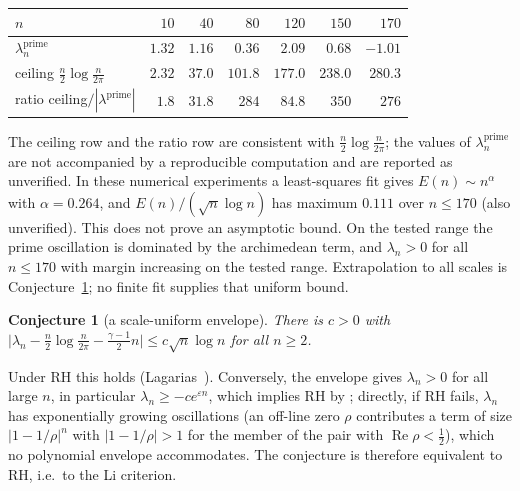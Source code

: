 \documentclass[11pt]{amsart}
\newtheorem{conjecture}[theorem]{Conjecture}
\theoremstyle{definition}
\theoremstyle{remark}
\theoremstyle{definition}
\renewcommand{\Re}{\operatorname{Re}}
\begin{document}
\begin{center}\small
\begin{tabular}{lrrrrrr}
\toprule
$n$ & $10$ & $40$ & $80$ & $120$ & $150$ & $170$\\
\midrule
$\lambda_n^{\mathrm{prime}}$ & $1.32$ & $1.16$ & $0.36$ & $2.09$ & $0.68$ & $-1.01$\\
ceiling $\tfrac{n}{2}\log\tfrac{n}{2\pi}$ & $2.32$ & $37.0$ & $101.8$ & $177.0$ & $238.0$ & $280.3$\\
ratio ceiling$/|\lambda^{\mathrm{prime}}|$ & $1.8$ & $31.8$ & $284$ & $84.8$ & $350$ & $276$\\
\bottomrule
\end{tabular}
\end{center}
\noindent The ceiling row and the ratio row are consistent with $\tfrac n2\log\tfrac n{2\pi}$; the values
of $\lambda_n^{\mathrm{prime}}$ are not accompanied by a reproducible computation and are
reported as unverified.  In these numerical experiments a least-squares fit gives $E(n)\sim n^{\alpha}$
with $\alpha=0.264$, and $E(n)/(\sqrt n\log n)$ has maximum $0.111$ over $n\le170$ (also unverified).
This does not prove an asymptotic bound.  On the tested range the prime oscillation is dominated by the
archimedean term, and $\lambda_n>0$ for all $n\le170$ with margin increasing on the tested range.
Extrapolation to all scales is Conjecture~\ref{conj:envelope}; no finite fit supplies that uniform
bound.

\begin{conjecture}[a scale-uniform envelope]\label{conj:envelope}
There is $c>0$ with
$\bigl|\lambda_n-\tfrac n2\log\tfrac n{2\pi}-\tfrac{\gamma-1}2n\bigr|\le c\sqrt n\log n$ for all $n\ge2$.
\end{conjecture}

\noindent Under RH this holds (Lagarias~\cite[Thm.~6.1]{Lagarias2007}).  Conversely, the envelope gives
$\lambda_n>0$ for all large $n$, in particular $\lambda_n\ge-ce^{\varepsilon n}$, which implies RH by
\cite[Thm.~1]{BombieriLagarias1999}; directly, if RH fails,
$\lambda_n$ has exponentially growing oscillations (an off-line zero $\rho$ contributes a term of size
$|1-1/\rho|^n$ with $|1-1/\rho|>1$ for the member of the pair with $\Re\rho<\tfrac12$), which no
polynomial envelope accommodates.  The conjecture is therefore equivalent to RH, i.e.\ to the Li
criterion.
\end{document}
